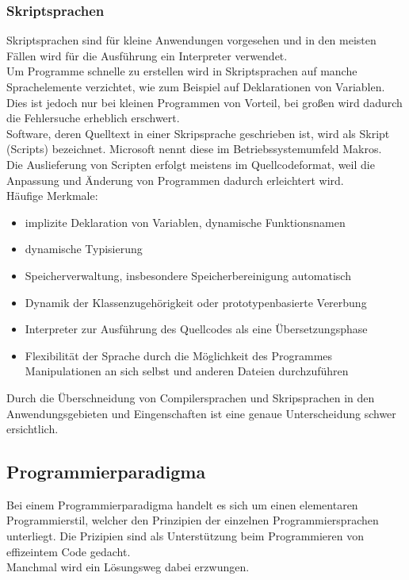 \documentclass[12pt,a4paper]{report}
\begin{document}
\subsubsection{Skriptsprachen}
Skriptsprachen sind für kleine Anwendungen vorgesehen und in den meisten Fällen wird für die Ausführung ein Interpreter verwendet.\\
Um Programme schnelle zu erstellen wird in Skriptsprachen auf manche Sprachelemente verzichtet, wie zum Beispiel auf Deklarationen von Variablen. Dies ist jedoch nur bei kleinen Programmen von Vorteil, bei großen wird dadurch die Fehlersuche erheblich erschwert.\\
Software, deren Quelltext in einer Skripsprache geschrieben ist, wird als Skript (Scripts) bezeichnet. Microsoft nennt diese im Betriebssystemumfeld Makros.\\
Die Auslieferung von Scripten erfolgt meistens im Quellcodeformat, weil die Anpassung und Änderung von Programmen dadurch erleichtert wird.
\\Häufige Merkmale:
\begin{itemize}
\item implizite Deklaration von Variablen, dynamische Funktionsnamen
\item dynamische Typisierung
\item Speicherverwaltung, insbesondere Speicherbereinigung automatisch
\item Dynamik der Klassenzugehörigkeit oder prototypenbasierte Vererbung
\item Interpreter zur Ausführung des Quellcodes als eine Übersetzungsphase
\item Flexibilität der Sprache durch die Möglichkeit des Programmes Manipulationen an sich selbst und anderen Dateien durchzuführen
\end{itemize}
Durch die Überschneidung von Compilersprachen und Skripsprachen in den Anwendungsgebieten und Eingenschaften ist eine genaue Unterscheidung schwer ersichtlich.

\subsection{Programmierparadigma}
Bei einem Programmierparadigma handelt es sich um einen elementaren Programmierstil, welcher den Prinzipien der einzelnen Programmiersprachen unterliegt. Die Prizipien sind als Unterstützung beim Programmieren von effizeintem Code gedacht.
\\Manchmal wird ein Lösungsweg dabei erzwungen.\\
\end{document}
